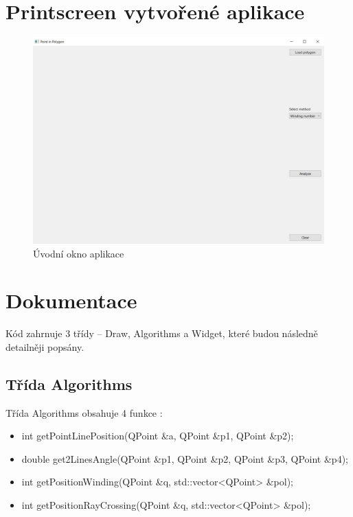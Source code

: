 \documentclass[11pt]{article}
\begin{document}
\clearpage

\section{Printscreen vytvořené aplikace}
\begin{figure}[htbh]
	\centering
	\includegraphics[scale=0.4]{images/aplikace_uvodni_okno.png} 
	\caption{Úvodní okno aplikace}
	\label{fig:uvodni_okno}
\end{figure} 


\section{Dokumentace}
Kód zahrnuje 3 třídy – Draw, Algorithms a Widget, které budou následně detailněji popsány.      

\subsection{Třída Algorithms}
Třída Algorithms obsahuje 4 funkce :  

\begin{itemize}
\item int getPointLinePosition(QPoint \&a, QPoint \&p1, QPoint \&p2);
\item double get2LinesAngle(QPoint \&p1, QPoint \&p2, QPoint \&p3, QPoint \&p4);
\item int getPositionWinding(QPoint \&q, std::vector<QPoint> \&pol);
\item int getPositionRayCrossing(QPoint \&q, std::vector<QPoint> \&pol);
\end{itemize}
\end{document}
